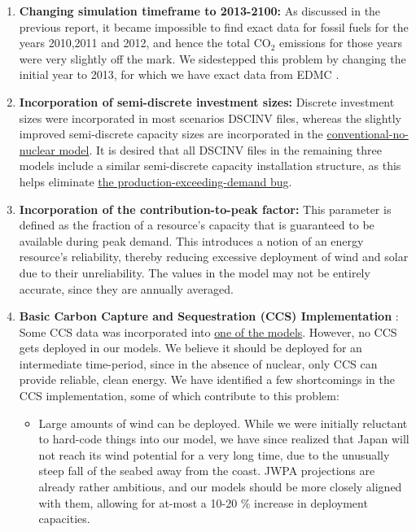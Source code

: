 \documentclass[14pt,a4paper]{article} %
\begin{document}
\begin{enumerate}
\item \textbf{Changing simulation timeframe to 2013-2100:} As discussed in the previous report, it became impossible to find exact data for fossil fuels for the years 2010,2011 and 2012, and hence the total CO$_2$ emissions for those years were very slightly off the mark. We sidestepped this problem by changing the initial year to 2013, for which we have exact data from EDMC \cite{noauthor_energy_2018}.

\item \textbf{Incorporation of semi-discrete investment sizes:} Discrete investment sizes were incorporated in most scenarios DSCINV files, whereas the slightly improved semi-discrete capacity sizes are incorporated in the \href{https://github.com/arfc/i2cner/tree/master/JPN-Main-Model/active/co2-constrnt-conv-nonuc}{conventional-no-nuclear model}. It is desired that all DSCINV files in the remaining three models include a similar semi-discrete capacity installation structure, as this helps eliminate \href{https://github.com/arfc/i2cner/issues/74}{the production-exceeding-demand bug}.\\

\item \textbf{Incorporation of the contribution-to-peak \cite{gargiulo_documentation_2005} factor:} This parameter is defined as the fraction of a resource's capacity that is guaranteed to be available during peak demand. This introduces a notion of an energy resource's reliability, thereby reducing excessive deployment of wind and solar due to their unreliability. The values in the model \cite{kato_energy_2016} may not be entirely accurate, since they are annually averaged.\\

\item \textbf{Basic Carbon Capture and Sequestration (CCS) Implementation} : Some CCS data \cite{kato_energy_2016}  was incorporated into \href{https://github.com/arfc/i2cner/tree/master/JPN-Main-Model/active/i2cner-nonuc}{one of the models}. However, no CCS gets deployed in our models. We believe  it should be deployed for an intermediate time-period, since in the absence of nuclear, only CCS can provide reliable, clean energy. We have identified a few shortcomings in the CCS implementation, some of which contribute to this problem:

\begin{itemize}

\item Large amounts of wind can be deployed. While we were initially reluctant to hard-code things into our model, we have since realized that Japan will not reach its wind potential for a very long time, due to the unusually steep fall of the seabed away from the coast. JWPA projections \cite{heger_wind_2016} are already rather ambitious, and our models should be more closely aligned with them, allowing for at-most a 10-20 \% increase in deployment capacities.


\end{itemize}
\end{enumerate}
\end{document}
